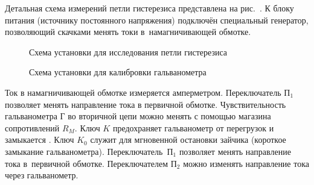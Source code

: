 %

\experiment

Детальная схема измерений петли гистерезиса представлена
на рис.~.
К блоку питания (источнику постоянного напряжения)
подключён специальный генератор, позволяющий скачками менять токи
в~намагничивающей обмотке.

%

\begin{figure}[h!]
	\caption{Схема установки для исследования петли гистерезиса}
\end{figure}

\begin{figure}[h!]
    \caption{Схема установки для калибровки гальванометра}
\end{figure}

Ток в  намагничивающей  обмотке  измеряется   амперметром. Переключатель
$\text{П}_1$ позволяет менять направление тока в первичной обмотке.
Чувствительность гальванометра $\text{Г}$ во вторичной цепи можно менять  с
помощью  магазина  сопротивлений $R_M$.  Ключ $K$ предохраняет гальванометр  от
перегрузок и замыкается .  Ключ $K_0$  служит  для  мгновенной остановки зайчика  (короткое
замыкание  гальванометра). Переключатель~П$_1$ позволяет менять направление
тока в~первичной обмотке. Переключателем $\text{П}_2$ можно изменять
направление тока через гальванометр.





